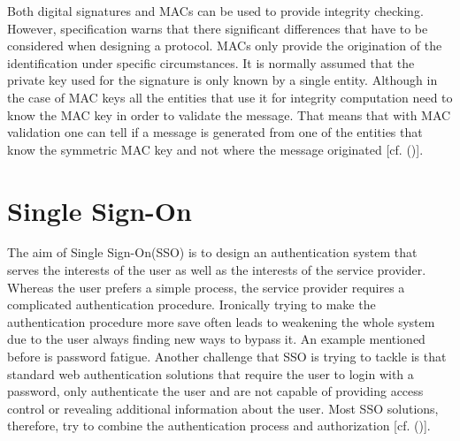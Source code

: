 {{	Both digital signatures and MACs can be used to provide integrity checking. However, specification warns that there significant differences that have to be considered when designing a protocol. MACs only provide the origination of the identification under specific circumstances. It is normally assumed that the private key used for the signature is only known by a single entity. Although in the case of MAC keys all the entities that use it for integrity computation need to know the MAC key in order to validate the message. That means that with MAC validation one can tell if a message is generated from one of the entities that know the symmetric MAC key and not where the message originated [cf. (\cite{JWT:IETF:Jones:2015})].


\section{Single Sign-On}


The aim of Single Sign-On(SSO) is to design an authentication system that serves the interests of the user as well as the interests of the service provider. Whereas the user prefers a simple process, the service provider requires a complicated authentication procedure. Ironically trying to make the authentication procedure more save often leads to weakening the whole system due to the user always finding new ways to bypass it. An example mentioned before is password fatigue. Another challenge that SSO is trying to tackle is that standard web authentication solutions that require the user to login with a password, only authenticate the user and are not capable of providing access control or revealing additional information about the user. Most SSO solutions, therefore, try to combine the authentication process and authorization [cf. (\cite{Prochazka:2010:UCA})].

}}
